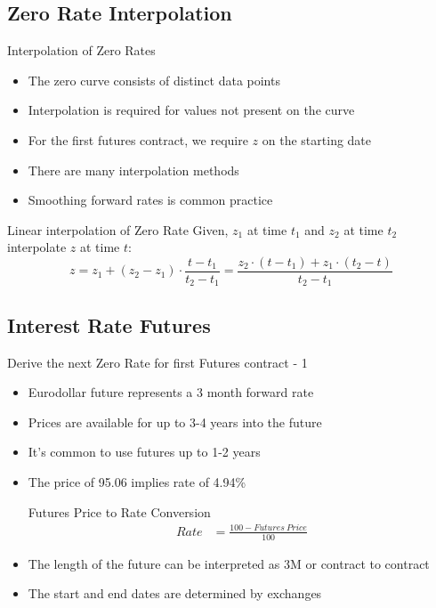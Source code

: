 \documentclass[handout, aspectratio=169]{beamer}
\begin{document}
\subsection{Zero Rate Interpolation}
\begin{frame}{Interpolation of Zero Rates}
	\pause
	\begin{itemize}
		\item The zero curve consists of distinct data points
		\item Interpolation is required for values not present on the curve
		\item For the first futures contract, we require $z$ on the starting date
		\item There are many interpolation methods
		\item Smoothing forward rates is common practice
	\end{itemize}
	\begin{block}{Linear interpolation of Zero Rate}
		\small Given, $z_1$ at time $t_1$ and $z_2$ at time $t_2$ interpolate $z$ at time $t$:
		\[
		z = z_1 + (z_2 - z_1) \cdot \frac{t - t_1}{t_2 - t_1} = \frac{z_2 \cdot (t - t_1) + z_1 \cdot (t_2 - t)}{t_2 - t_1}
		\]
	\end{block}
\end{frame}

\subsection{Interest Rate Futures}
\begin{frame}{Derive the next Zero Rate for first Futures contract - 1}
	\begin{itemize}
		\item Eurodollar future represents a 3 month forward rate
		\item Prices are available for up to 3-4 years into the future
		\item It's common to use futures up to 1-2 years
		\item The price of 95.06 implies rate of 4.94\%
		\begin{block}{Futures Price to Rate Conversion}
			\begin{align*}
				Rate & = \frac{100 - Futures\ Price}{100}
			\end{align*}
		\end{block}
		\item The length of the future can be interpreted as 3M or contract to contract 
		\item The start and end dates are determined by exchanges
	\end{itemize}
\end{frame}
\end{document}

